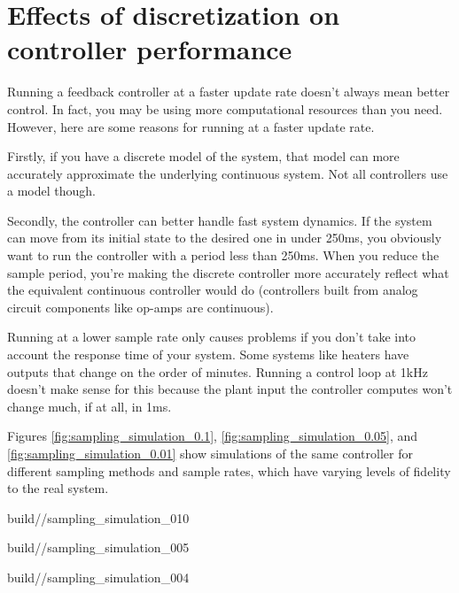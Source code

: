 \section{Effects of discretization on controller performance}

Running a feedback controller at a faster update rate doesn't always mean better
control. In fact, you may be using more computational resources than you need.
However, here are some reasons for running at a faster update rate.

Firstly, if you have a discrete \gls{model} of the \gls{system}, that
\gls{model} can more accurately approximate the underlying continuous
\gls{system}. Not all controllers use a \gls{model} though.

Secondly, the controller can better handle fast \gls{system} dynamics. If the
\gls{system} can move from its initial state to the desired one in under 250ms,
you obviously want to run the controller with a period less than 250ms. When you
reduce the sample period, you're making the discrete controller more accurately
reflect what the equivalent continuous controller would do (controllers built
from analog circuit components like op-amps are continuous).

Running at a lower sample rate only causes problems if you don't take into
account the response time of your \gls{system}. Some \glspl{system} like heaters
have \glspl{output} that change on the order of minutes. Running a control loop
at 1kHz doesn't make sense for this because the \gls{plant} \gls{input} the
controller computes won't change much, if at all, in 1ms.

Figures \ref{fig:sampling_simulation_0.1}, \ref{fig:sampling_simulation_0.05},
and \ref{fig:sampling_simulation_0.01} show simulations of the same controller
for different sampling methods and sample rates, which have varying levels of
fidelity to the real \gls{system}.
\begin{bookfigure}
  \begin{minisvg}{2}{build/\chapterpath/sampling_simulation_010}
    \caption{Sampling methods for system simulation with $T = 0.1s$}
    \label{fig:sampling_simulation_0.1}
  \end{minisvg}
  \hfill
  \begin{minisvg}{2}{build/\chapterpath/sampling_simulation_005}
    \caption{Sampling methods for system simulation with $T = 0.05s$}
    \label{fig:sampling_simulation_0.05}
  \end{minisvg}
  \hfill
  \begin{minisvg}{2}{build/\chapterpath/sampling_simulation_004}
    \caption{Sampling methods for system simulation with $T = 0.01s$}
    \label{fig:sampling_simulation_0.01}
  \end{minisvg}
\end{bookfigure}

